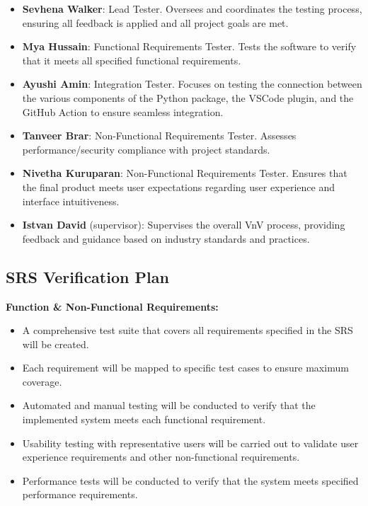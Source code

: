 \documentclass[12pt, titlepage]{article}
\begin{document}
\begin{itemize}
    \item \textbf{Sevhena Walker}: Lead Tester. Oversees and coordinates the testing process, ensuring all feedback is applied and all project goals are met.
    \item \textbf{Mya Hussain}: Functional Requirements Tester. Tests the software to verify that it meets all specified functional requirements.
    \item \textbf{Ayushi Amin}: Integration Tester. Focuses on testing the connection between the various components of the Python package, the VSCode plugin, and the GitHub Action to ensure seamless integration.
    \item \textbf{Tanveer Brar}: Non-Functional Requirements Tester. Assesses performance/security compliance with project standards.
    \item \textbf{Nivetha Kuruparan}: Non-Functional Requirements Tester. Ensures that the final product meets user expectations regarding user experience and interface intuitiveness.
    \item \textbf{Istvan David} (supervisor): Supervises the overall VnV process, providing feedback and guidance based on industry standards and practices.
\end{itemize}

\subsection{SRS Verification Plan}

\textbf{Function \& Non-Functional Requirements:}
\begin{itemize}
    \item A comprehensive test suite that covers all requirements specified in the SRS will be created.
    \item Each requirement will be mapped to specific test cases to ensure maximum coverage.
    \item Automated and manual testing will be conducted to verify that the implemented system meets each functional requirement.
    \item Usability testing with representative users will be carried out to validate user experience requirements and other non-functional requirements.
    \item Performance tests will be conducted to verify that the system meets specified performance requirements.
\end{itemize}
\end{document}
